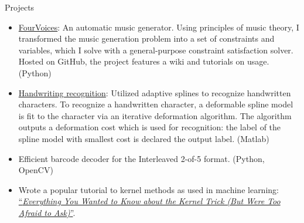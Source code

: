 \documentclass{resume}
\begin{document}
\vspace{0.5em}

\begin{component}{Projects}
	\begin{itemize}
	  \vspace{-0.5em}\item \href{https://github.com/erickim555/FourVoices}{FourVoices}: An automatic music generator.
Using principles of music theory, I transformed the music generation problem into a set of constraints and variables, which I solve with a general-purpose constraint satisfaction solver.
Hosted on GitHub, the project features a wiki and tutorials on usage.
		(Python)
        \vspace{-0.5em}\item \href{http://eric-kim.net/cs269\_fa2014/index.html}{Handwriting recognition}: Utilized adaptive splines to recognize handwritten characters.
To recognize a handwritten character, a deformable spline model is fit to the character via an iterative deformation algorithm.
The algorithm outputs a deformation cost which is used for recognition: the label of the spline model with smallest cost is declared the output label.
(Matlab)
        \vspace{-0.5em}\item Efficient barcode decoder
	        for the Interleaved 2-of-5 format. (Python, OpenCV)
            \vspace{-0.5em}\item Wrote a popular tutorial to kernel methods as used in machine learning: \href{http://eric-kim.net/eric-kim-net/posts/1/kernel\_trick\_blog\_ekim\_12\_20\_2017.pdf}{``\emph{Everything You Wanted to Know about the Kernel Trick (But Were Too Afraid to Ask)}''}.
	\end{itemize}
\end{component}

\vspace{-1.0em}
\end{document}
